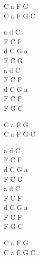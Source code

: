 \begin{chord}
    C a F G\\
    C a F G C
	
    a d C\\
    F C F\\
    d C G a\\
    F C G\\
    a d C\\
    F C F\\
    d C G a\\
    F C F\\
    F G C
	
    C a F G\\
    C a F G C

    a d C\\
    F C F\\
    d C G a\\
    F C G\\
    a d C\\
    F C F\\
    d C G a\\
    F C F\\
    F G C
	
    C a F G\\
    C a F G C
\end{chord}